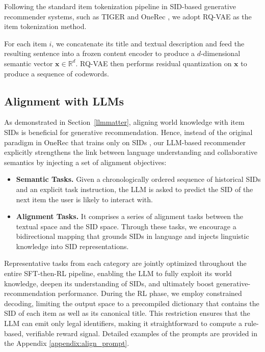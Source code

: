 {{%


Following the standard item tokenization pipeline in SID-based generative recommender systems, such as TIGER \citep{TIGER} and OneRec \citep{OneRec}, we adopt RQ-VAE \citep{rqvae} as the item tokenization method. }
For each item $i$, we concatenate its title and textual description and feed the resulting sentence into a frozen content encoder to produce a $d$-dimensional semantic vector $\mathbf{x}\in\mathbb{R}^{d}$.
RQ-VAE then performs residual quantization on $\mathbf{x}$ to produce a sequence of codewords.

\subsection{Alignment with LLMs} \label{sec:alignment_llm}
As demonstrated in Section~\ref{llmmatter}, aligning world knowledge with item SIDs is beneficial for generative recommendation.  
Hence, instead of the original paradigm in OneRec that trains only on SIDs \citep{TIGER, OneRec, mtgr}, our LLM-based recommender explicitly strengthens the link between language understanding and collaborative semantics by injecting a set of alignment objectives:
\begin{itemize}[leftmargin=*]
    \item \textbf{Semantic Tasks.} 
    Given a chronologically ordered sequence of historical SIDs and an explicit task instruction, the LLM is asked to predict the SID of the next item the user is likely to interact with. 
    \item \textbf{Alignment Tasks.} %
It comprises a series of alignment tasks between the textual space and the SID space. Through these tasks, we encourage a bidirectional mapping that grounds SIDs in language and injects linguistic knowledge into SID representations.
\end{itemize}
Representative tasks from each category are jointly optimized throughout the entire SFT-then-RL pipeline, enabling the LLM to fully exploit its world knowledge, deepen its understanding of SIDs, and ultimately boost generative-recommendation performance. During the RL phase, we employ constrained decoding, limiting the output space to a precompiled dictionary that contains the SID of each item as well as its canonical title. This restriction ensures that the LLM can emit only legal identifiers, making it straightforward to compute a rule-based, verifiable reward signal. Detailed examples of the prompts are provided in the Appendix \ref{appendix:align_prompt}.
}


